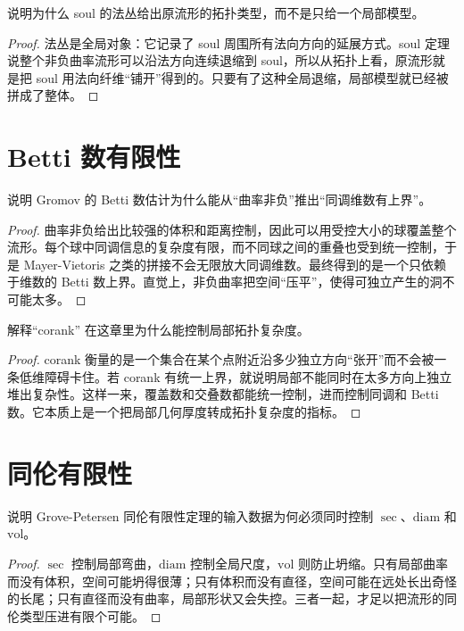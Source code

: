 \documentclass[11pt,a4paper,openany]{ctexbook}
\numberwithin{equation}{chapter}
\begin{document}
\begin{problem}
说明为什么 soul 的法丛给出原流形的拓扑类型，而不是只给一个局部模型。
\end{problem}
\begin{proof}
法丛是全局对象：它记录了 soul 周围所有法向方向的延展方式。soul 定理说整个非负曲率流形可以沿法方向连续退缩到 soul，所以从拓扑上看，原流形就是把 soul 用法向纤维“铺开”得到的。只要有了这种全局退缩，局部模型就已经被拼成了整体。  
\end{proof}

\section{Betti 数有限性}

\begin{problem}
说明 Gromov 的 Betti 数估计为什么能从“曲率非负”推出“同调维数有上界”。
\end{problem}
\begin{proof}
曲率非负给出比较强的体积和距离控制，因此可以用受控大小的球覆盖整个流形。每个球中同调信息的复杂度有限，而不同球之间的重叠也受到统一控制，于是 Mayer-Vietoris 之类的拼接不会无限放大同调维数。最终得到的是一个只依赖于维数的 Betti 数上界。直觉上，非负曲率把空间“压平”，使得可独立产生的洞不可能太多。  
\end{proof}

\begin{problem}
解释“corank” 在这章里为什么能控制局部拓扑复杂度。
\end{problem}
\begin{proof}
corank 衡量的是一个集合在某个点附近沿多少独立方向“张开”而不会被一条低维障碍卡住。若 corank 有统一上界，就说明局部不能同时在太多方向上独立堆出复杂性。这样一来，覆盖数和交叠数都能统一控制，进而控制同调和 Betti 数。它本质上是一个把局部几何厚度转成拓扑复杂度的指标。  
\end{proof}

\section{同伦有限性}

\begin{problem}
说明 Grove-Petersen 同伦有限性定理的输入数据为何必须同时控制 \(\sec\)、\(\mathrm{diam}\) 和 \(\mathrm{vol}\)。
\end{problem}
\begin{proof}
\(\sec\) 控制局部弯曲，\(\mathrm{diam}\) 控制全局尺度，\(\mathrm{vol}\) 则防止坍缩。只有局部曲率而没有体积，空间可能坍得很薄；只有体积而没有直径，空间可能在远处长出奇怪的长尾；只有直径而没有曲率，局部形状又会失控。三者一起，才足以把流形的同伦类型压进有限个可能。  
\end{proof}
\end{document}
